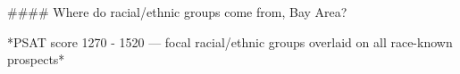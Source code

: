 #### Where do racial/ethnic groups come from, Bay Area?

*PSAT score 1270 - 1520 — focal racial/ethnic groups overlaid on all race-known prospects*
